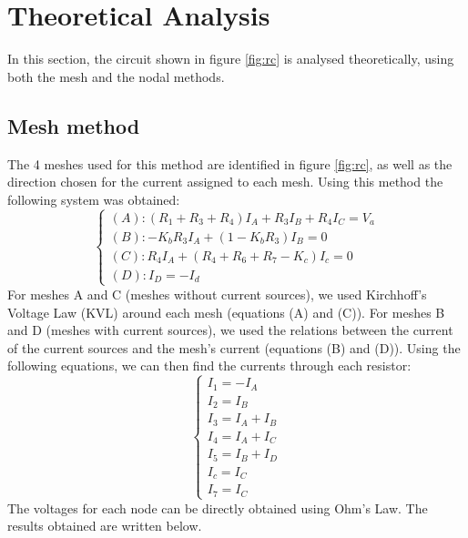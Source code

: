 \newpage
\section{Theoretical Analysis}
\label{sec:analysis}

In this section, the circuit shown in figure \ref{fig:rc} is analysed
theoretically, using both the mesh and the nodal methods.

\subsection{Mesh method}
The 4 meshes used for this method are identified in figure \ref{fig:rc}, as well as the direction chosen for the current assigned to each mesh.
Using this method the following system was obtained:
\begin{equation}
  \begin{cases}
    \left(A\right): \left(R_{1}+R_{3}+R_{4}\right)I_{A}+R_{3}I_{B}+R_{4}I_{C}=V_{a} \\
    \left(B\right): -K_{b}R_{3}I_{A}+\left(1-K_{b}R_{3}\right)I_{B}=0               \\
    \left(C\right): R_{4}I_{A}+\left(R_{4}+R_{6}+R_{7}-K_{c}\right)I_{c}=0        \\
    \left(D\right): I_{D}=-I_{d}
  \end{cases}
\end{equation}
For meshes A and C (meshes without current sources), we used Kirchhoff's Voltage Law (KVL) around each mesh (equations (A) and (C)).
For meshes B and D (meshes with current sources), we used the relations between the current of the current sources and the mesh's current (equations (B) and (D)).
Using the following equations, we can then find the currents through each resistor:
\begin{equation}
  \begin{cases}
    I_{1}=-I_{A}      \\
    I_{2}=I_{B}       \\
    I_{3}=I_{A}+I_{B} \\
    I_{4}=I_{A}+I_{C} \\
    I_{5}=I_{B}+I_{D} \\
    I_{c}=I_{C}       \\
    I_{7}=I_{C}
  \end{cases}
\end{equation}
The voltages for each node can be directly obtained using Ohm's Law.
The results obtained are written below.

